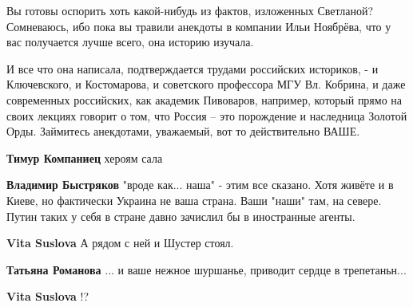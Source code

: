 \begin{itemize}
\begin{itemize}
Вы готовы оспорить хоть какой-нибудь из фактов, изложенных Светланой?
Сомневаюсь, ибо пока вы травили анекдоты в компании Ильи Ноябрёва, что у вас
получается лучше всего, она историю изучала. 

И все что она написала, подтверждается трудами российских историков, - и
Ключевского, и Костомарова, и советского профессора МГУ Вл. Кобрина, и даже
современных российских, как академик Пивоваров, например, который прямо на
своих лекциях говорит о том, что Россия – это порождение и наследница Золотой
Орды. Займитесь анекдотами, уважаемый, вот то действительно ВАШЕ.

 
\textbf{Тимур Компаниец} хероям сала

 
\textbf{Владимир Быстряков} "вроде как... наша" - этим все сказано. Хотя живёте и в Киеве, но фактически Украина не ваша страна. Ваши "наши" там, на севере. Путин таких у себя в стране давно зачислил бы в иностранные агенты.

 
\textbf{Vita Suslova} А рядом с ней и Шустер стоял.

 
\textbf{Татьяна Романова} ... и ваше нежное шуршанье, приводит сердце в трепетаньн...

 
\textbf{Vita Suslova} !?


\end{itemize}
\end{itemize}
